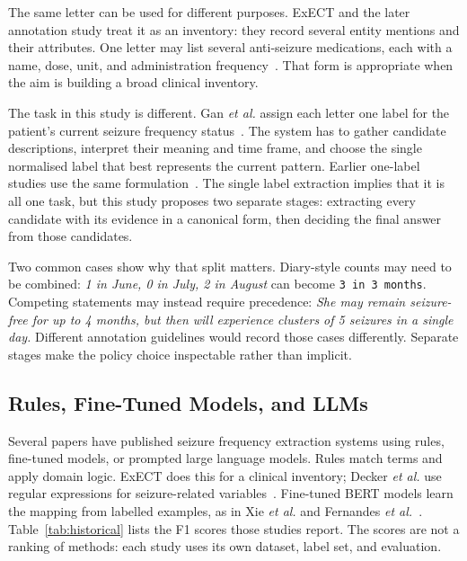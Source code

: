 \documentclass[conference]{IEEEtran}
\begin{document}
The same letter can be used for different purposes. 
ExECT and the later annotation study treat it as 
an inventory: they record several entity mentions and 
their attributes. One letter may list several anti-seizure 
medications, each with a name, dose, unit, and 
administration frequency~\cite{b4,b3}. That form is 
appropriate when the aim is building a broad clinical
inventory.

The task in this study is different. Gan \emph{et al.} 
assign each letter one label for the patient's current 
seizure frequency status~\cite{b5}. The system has to gather 
candidate descriptions, interpret their meaning and 
time frame, and choose the single normalised label 
that best represents the current pattern. Earlier 
one-label studies use the same formulation~\cite{b6,b7,b8}. 
The single label extraction implies that it is all one 
task, but this study proposes two separate stages: 
extracting every candidate with its evidence in a 
canonical form, then deciding the final answer from 
those candidates.

Two common cases show why that split matters. 
Diary-style counts may need to be combined: \emph{1 in June, 
0 in July, 2 in August} can become \texttt{3 in 3 months}. 
Competing statements may instead require precedence: 
\emph{She may remain seizure-free for up to 4 months, but 
then will experience clusters of 5 seizures in a single day.} 
Different annotation guidelines would record those cases 
differently. Separate stages make the policy choice 
inspectable rather than implicit.

\subsection{Rules, Fine-Tuned Models, and LLMs}

Several papers have published seizure frequency 
extraction systems using rules, fine-tuned models, or 
prompted large language models. Rules match terms 
and apply domain logic. ExECT does this for a clinical 
inventory; Decker \emph{et al.} use regular expressions 
for seizure-related variables~\cite{b4,b9}. Fine-tuned 
BERT models learn the mapping from labelled examples, 
as in Xie \emph{et al.} and Fernandes \emph{et al.}~\cite{b6,b10}. 
Table~\ref{tab:historical} lists the F1 scores those studies 
report. The scores are not a ranking of methods: each 
study uses its own dataset, label set, and evaluation.
\end{document}
